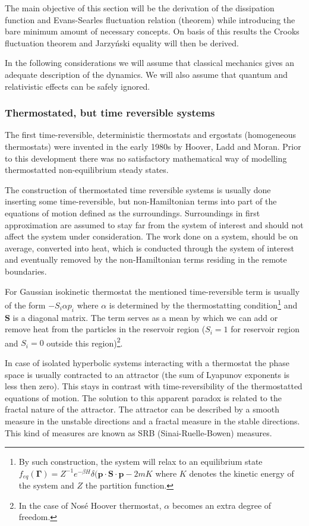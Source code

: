 \documentclass[a4paper,12pt]{article}
\begin{document}
The main objective of this section will be the derivation of the dissipation function and Evans-Searles fluctuation relation (theorem) while introducing the bare minimum amount of necessary concepts. On basis of this results the Crooks fluctuation theorem and Jarzyński equality will then be derived.  

In the following considerations we will assume that classical mechanics gives an adequate description of the dynamics. We will also assume that quantum and relativistic effects can be safely ignored.

\subsubsection{Thermostated, but time reversible systems}

The first time-reversible, deterministic thermostats and ergostats (homogeneous thermostats) were invented in the early 1980s by Hoover, Ladd and Moran. Prior to this development there was no satisfactory mathematical way of modelling thermostatted non-equilibrium steady states\cite{Hoover:1982dp}.

The construction of thermostated time reversible systems is usually done inserting some time-reversible, but non-Hamiltonian terms into part of the equations of motion defined as the surroundings. Surroundings in first approximation are assumed to stay far from the system of interest and should not affect the system under consideration.
The work done on a system, should be on average, converted into heat, which is conducted through the system of interest and eventually removed by the non-Hamiltonian terms residing in the remote boundaries.

For Gaussian isokinetic thermostat the mentioned time-reversible term is usually of the form $- S_i \alpha p_i $ where $\alpha$ is determined by the thermostatting condition\footnote{By such construction, the system will relax to an equilibrium state $f_{eq}(\bm{\Gamma})=Z^{-1} e^{-\beta H}\delta(\bm{p}\cdot \bm{S}\cdot \bm{p}-2m K$ where $K$ denotes the kinetic energy of the system and $Z$ the partition function.} and $\textbf{S}$ is a diagonal matrix. The term serves as a mean by which we can add or remove heat from the particles in the reservoir region ($S_i =1$ for reservoir region and $S_i = 0$ outside this region)\footnote{In the case of Nosé Hoover thermostat, $\alpha$ becomes an extra degree of freedom\cite{Evans:2241458}.}.

In case of isolated hyperbolic systems interacting with a thermostat the phase space is usually contracted to an attractor (the sum of Lyapunov exponents is less then zero).
This stays in contrast with time-reversibility of the thermostatted equations of motion. The solution to this apparent paradox is related to the fractal nature of the attractor.
The attractor can be described by a smooth measure in the unstable directions and a fractal measure in the stable directions.
This kind of measures are known as SRB (Sinai-Ruelle-Bowen) measures\cite{Dorfman:ozm67-zD}. 
\end{document}
